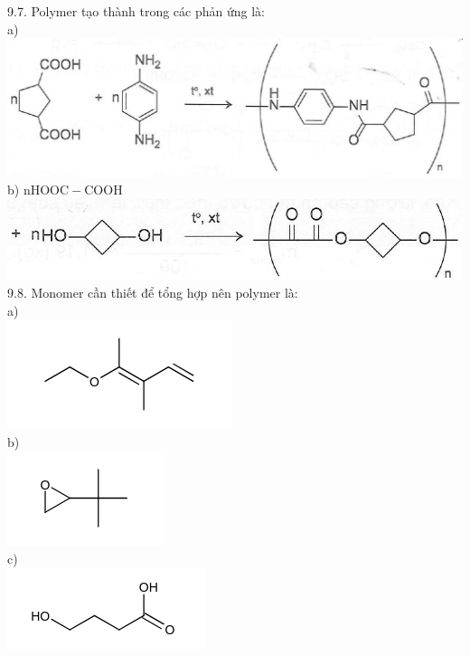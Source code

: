 \documentclass[10pt]{article}
\begin{document}
9.7. Polymer tạo thành trong các phản ứng là:\\
a)\\
\includegraphics[max width=\textwidth, center]{2025_10_23_b4e16b74380d0f7e7700g-060(2)}\\
b) $\mathrm{nHOOC}-\mathrm{COOH}$\\
\includegraphics[max width=\textwidth, center]{2025_10_23_b4e16b74380d0f7e7700g-061(2)}\\
9.8. Monomer cần thiết để tổng hợp nên polymer là:\\
a)\\
\includegraphics{smile-a4c961785c95371e86aeb59cdc9cce8c8d7b0405}\\
b)\\
\includegraphics{smile-f6b7ae1e509600da000c0c8eecde73dfa4384242}\\
c)\\
\includegraphics{smile-990996c24d45f4152844705f832b13f14b080997}\\
\end{document}
